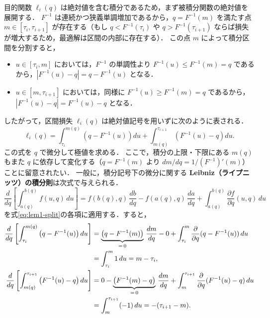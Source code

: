 \documentclass[a4paper,10pt]{jsarticle}
\makeatletter
\theoremstyle{definition}
\renewenvironment{proof}[1][\proofname]{\par
  \pushQED{\qed}%
  \normalfont \topsep6\p@\@plus6\p@\relax
  \trivlist
  \item[\hskip\labelsep\textbf{#1}]\ignorespaces
}{%
  \popQED\endtrivlist\@endpefalse
}
\renewcommand{\proofname}{証明}
\renewcommand{\Finv}{F^{-1}}
\makeatother
\begin{document}
\begin{proof}
目的関数 $\ell_i(q)$ は絶対値を含む積分であるため，まず被積分関数の絶対値を展開する．
$\Finv$ は連続かつ狭義単調増加であるから，$q = \Finv(m)$ を満たす点 $m \in [\tau_i, \tau_{i+1}]$ が存在する（もし $q < \Finv(\tau_i)$ や $q > \Finv(\tau_{i+1})$ ならば損失が増大するため，最適解は区間の内部に存在する）．
この点 $m$ によって積分区間を分割すると，
\begin{itemize}
  \item $u \in [\tau_i, m]$ においては，$\Finv$ の単調性より $\Finv(u) \le \Finv(m) = q$ であるから，$|\Finv(u) - q| = q - \Finv(u)$ となる．
  \item $u \in [m, \tau_{i+1}]$ においては，同様に $\Finv(u) \ge \Finv(m) = q$ であるから，$|\Finv(u) - q| = \Finv(u) - q$ となる．
\end{itemize}
したがって，区間損失 $\ell_i(q)$ は絶対値記号を用いずに次のように表される．
\begin{equation}
  \ell_i(q) = \int_{\tau_i}^{m(q)} \left(q - \Finv(u)\right)du + \int_{m(q)}^{\tau_{i+1}} \left(\Finv(u) - q\right)du.
  \label{eq:lem1-split}
\end{equation}
この式を $q$ で微分して極値を求める．
ここで，積分の上限・下限にある $m(q)$ もまた $q$ に依存して変化する（$q = \Finv(m)$ より $dm/dq = 1/(\Finv)'(m)$）ことに留意されたい．
一般に，積分記号下の微分に関する \textbf{Leibniz（ライプニッツ）の積分則}は次式で与えられる．
\begin{equation}
  \frac{d}{dq}\left[\int_{a(q)}^{b(q)} f(u, q)\,du\right] = f(b(q), q)\,\frac{db}{dq} - f(a(q), q)\,\frac{da}{dq} + \int_{a(q)}^{b(q)} \frac{\partial f}{\partial q}(u, q)\,du
  \label{eq:leibniz-general}
\end{equation}
を式\eqref{eq:lem1-split}の各項に適用する．すると，
\begin{align}
  \frac{d}{dq}\left[\int_{\tau_i}^{m(q)} \left(q - \Finv(u)\right)du\right]
  &= \underbrace{\left(q - \Finv(m)\right)}_{=\,0}\,\frac{dm}{dq} - 0 + \int_{\tau_i}^m \frac{\partial}{\partial q}(q - \Finv(u))\,du \notag\\
  &= \int_{\tau_i}^m 1\,du = m - \tau_i,
  \label{eq:leibniz-term1}\\
  \frac{d}{dq}\left[\int_{m(q)}^{\tau_{i+1}} \left(\Finv(u) - q\right)du\right]
  &= 0 - \underbrace{\left(\Finv(m) - q\right)}_{=\,0}\,\frac{dm}{dq} + \int_m^{\tau_{i+1}} \frac{\partial}{\partial q}(\Finv(u) - q)\,du \notag\\
  &= \int_m^{\tau_{i+1}} (-1)\,du = -( \tau_{i+1} - m ).
  \label{eq:leibniz-term2}

\end{align}
\end{proof}
\end{document}
